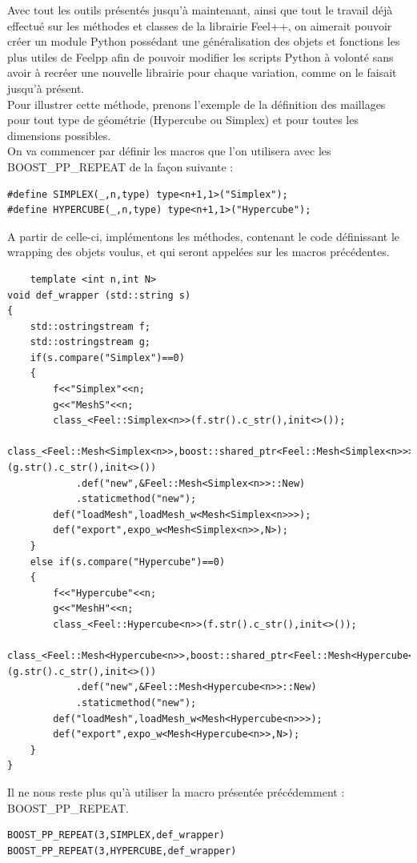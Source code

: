 \documentclass[french,12pt]{article}
\begin{document}
Avec tout les outils présentés jusqu'à maintenant, ainsi que tout le travail déjà effectué sur les méthodes et classes de la librairie Feel++, on aimerait pouvoir créer un module Python possédant une généralisation des objets et fonctions les plus utiles de Feelpp afin de pouvoir modifier les scripts Python à volonté sans avoir à recréer une nouvelle librairie pour chaque variation, comme on le faisait jusqu'à présent.\\

Pour illustrer cette méthode, prenons l'exemple de la définition des maillages pour tout type de géométrie (Hypercube ou Simplex) et pour toutes les dimensions possibles.\\

On va commencer par définir les macros que l'on utilisera avec les BOOST\_PP\_REPEAT de la façon suivante :
\begin{lstlisting}
#define SIMPLEX(_,n,type) type<n+1,1>("Simplex");
#define HYPERCUBE(_,n,type) type<n+1,1>("Hypercube");
\end{lstlisting}

A partir de celle-ci, implémentons les méthodes, contenant le code définissant le wrapping des objets voulus, et qui seront appelées sur les macros précédentes.
\begin{lstlisting}
    template <int n,int N>
void def_wrapper (std::string s)
{    
    std::ostringstream f;
    std::ostringstream g;
    if(s.compare("Simplex")==0)
    {
        f<<"Simplex"<<n;
        g<<"MeshS"<<n;
        class_<Feel::Simplex<n>>(f.str().c_str(),init<>());
        class_<Feel::Mesh<Simplex<n>>,boost::shared_ptr<Feel::Mesh<Simplex<n>>>,boost::noncopyable>(g.str().c_str(),init<>())
            .def("new",&Feel::Mesh<Simplex<n>>::New)
            .staticmethod("new");
        def("loadMesh",loadMesh_w<Mesh<Simplex<n>>>);
        def("export",expo_w<Mesh<Simplex<n>>,N>);
    }
    else if(s.compare("Hypercube")==0)
    {
        f<<"Hypercube"<<n;
        g<<"MeshH"<<n;   
        class_<Feel::Hypercube<n>>(f.str().c_str(),init<>());
        class_<Feel::Mesh<Hypercube<n>>,boost::shared_ptr<Feel::Mesh<Hypercube<n>>>,boost::noncopyable>(g.str().c_str(),init<>())
            .def("new",&Feel::Mesh<Hypercube<n>>::New)
            .staticmethod("new");
        def("loadMesh",loadMesh_w<Mesh<Hypercube<n>>>);
        def("export",expo_w<Mesh<Hypercube<n>>,N>);
    }
}
\end{lstlisting}

Il ne nous reste plus qu'à utiliser la macro présentée précédemment : BOOST\_PP\_REPEAT.
\begin{lstlisting}
BOOST_PP_REPEAT(3,SIMPLEX,def_wrapper)
BOOST_PP_REPEAT(3,HYPERCUBE,def_wrapper)
\end{lstlisting}
\end{document}
